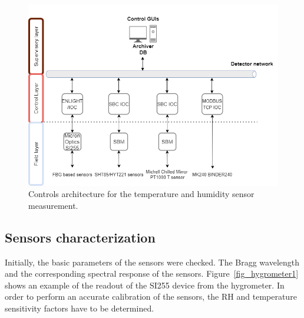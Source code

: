 \begin{figure}[!h]
\centering
\includegraphics[width=0.85\columnwidth]{Chapter5/images/FOS_dcs_scheme.png}
\caption{Controls architecture for the temperature and humidity sensor measurement.}
\label{fig:fos_arch}
\end{figure}
\newpage
\subsection{Sensors characterization}

Initially, the basic parameters of the sensors were checked. The Bragg wavelength and the corresponding spectral response of the sensors. 
Figure~\ref{fig_hygrometer1} shows an example of the readout of the SI255 device from the hygrometer. In order to perform an accurate calibration of the sensors, the \gls{RH} and temperature sensitivity factors have to be determined.

